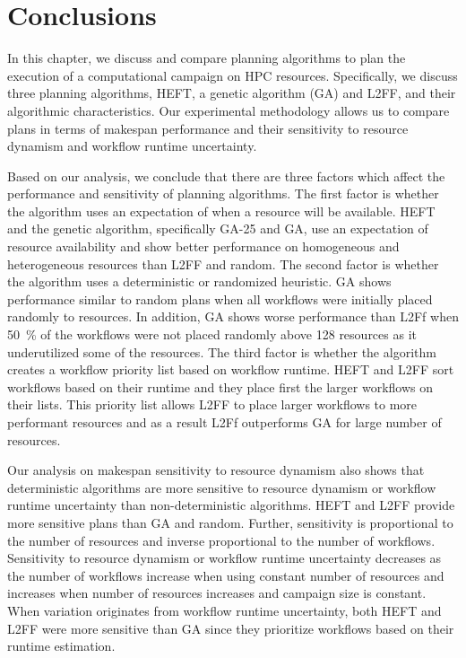 \section{Conclusions}
\label{sec:cf_algo_sel}
In this chapter, we discuss and compare planning algorithms to plan the execution of a computational campaign on HPC resources.
Specifically, we discuss three planning algorithms, HEFT, a genetic algorithm (GA) and L2FF, and their algorithmic characteristics.
Our experimental methodology allows us to compare plans in terms of makespan performance and their sensitivity to resource dynamism and workflow runtime uncertainty.

Based on our analysis, we conclude that there are three factors which affect the performance and sensitivity of planning algorithms.
The first factor is whether the algorithm uses an expectation of when a resource will be available.
HEFT and the genetic algorithm, specifically GA-25 and GA, use an expectation of resource availability and show better performance on homogeneous and heterogeneous resources than L2FF and random.
The second factor is whether the algorithm uses a deterministic or randomized heuristic.
GA shows performance similar to random plans when all workflows were initially placed randomly to resources.
In addition, GA shows worse performance than L2Ff when 50~\% of the workflows were not placed randomly above 128 resources as it underutilized some of the resources.
The third factor is whether the algorithm creates a workflow priority list based on workflow runtime.
HEFT and L2FF sort workflows based on their runtime and they place first the larger workflows on their lists.
This priority list allows L2FF to place larger workflows to more performant resources and as a result L2Ff outperforms GA for large number of resources.

Our analysis on makespan sensitivity to resource dynamism also shows that deterministic algorithms are more sensitive to resource dynamism or workflow runtime uncertainty than non-deterministic algorithms.
HEFT and L2FF provide more sensitive plans than GA and random.
Further, sensitivity is proportional to the number of resources and inverse proportional to the number of workflows.
Sensitivity to resource dynamism or workflow runtime uncertainty decreases as the number of workflows increase when using constant number of resources and increases when number of resources increases and campaign size is constant.
When variation originates from workflow runtime uncertainty, both HEFT and L2FF were more sensitive than GA since they prioritize workflows based on their runtime estimation.

